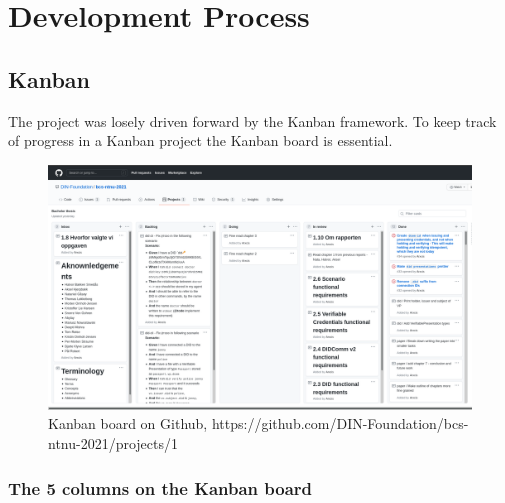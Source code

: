 \chapter{Development Process}

\section{Kanban}

The project was losely driven forward by the Kanban framework. To keep track of progress in a Kanban project the Kanban board is essential.

\begin{figure}[htbp]  %
  \centering
  \includegraphics[width=1\textwidth]{figures/github-kanban}
  \caption[Kanban board on Github]{Kanban board on Github, https://github.com/DIN-Foundation/bcs-ntnu-2021/projects/1}
  \label{fig:mapNTNU}
\end{figure}

\subsection{The 5 columns on the Kanban board}

